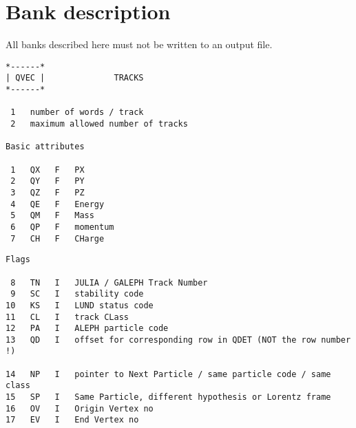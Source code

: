 \chapter{\label{sec-BNKDES}Bank description}
\par
All banks described here must not be written to an output file.
 
\begin{verbatim}
*------*
| QVEC |              TRACKS
*------*
 
 1   number of words / track
 2   maximum allowed number of tracks
 
Basic attributes
 
 1   QX   F   PX
 2   QY   F   PY
 3   QZ   F   PZ
 4   QE   F   Energy
 5   QM   F   Mass
 6   QP   F   momentum
 7   CH   F   CHarge
\end{verbatim}
\begin{verbatim}
Flags
 
 8   TN   I   JULIA / GALEPH Track Number
 9   SC   I   stability code
10   KS   I   LUND status code
11   CL   I   track CLass
12   PA   I   ALEPH particle code
13   QD   I   offset for corresponding row in QDET (NOT the row number !)
 
14   NP   I   pointer to Next Particle / same particle code / same class
15   SP   I   Same Particle, different hypothesis or Lorentz frame
16   OV   I   Origin Vertex no
17   EV   I   End Vertex no
 
\end{verbatim}
 
